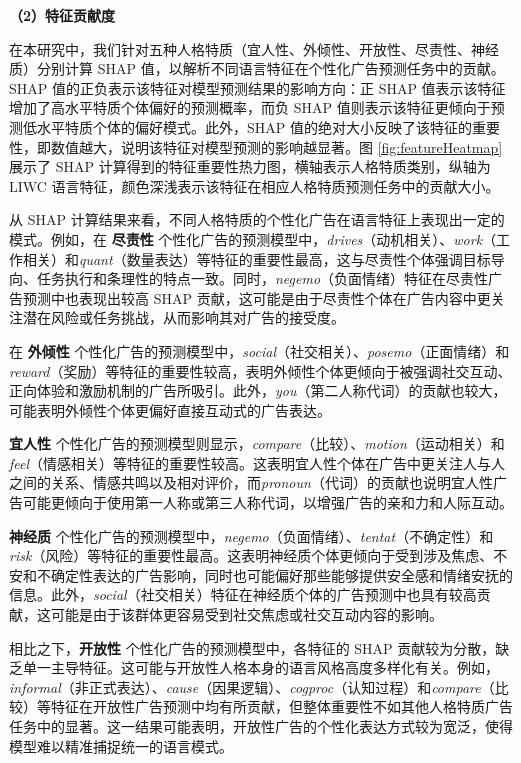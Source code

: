 \textbf{（2）特征贡献度}

在本研究中，我们针对五种人格特质（宜人性、外倾性、开放性、尽责性、神经质）分别计算 SHAP 值，以解析不同语言特征在个性化广告预测任务中的贡献。SHAP 值的正负表示该特征对模型预测结果的影响方向：正 SHAP 值表示该特征增加了高水平特质个体偏好的预测概率，而负 SHAP 值则表示该特征更倾向于预测低水平特质个体的偏好模式。此外，SHAP 值的绝对大小反映了该特征的重要性，即数值越大，说明该特征对模型预测的影响越显著。图 \ref{fig:featureHeatmap} 展示了 SHAP 计算得到的特征重要性热力图，横轴表示人格特质类别，纵轴为 LIWC 语言特征，颜色深浅表示该特征在相应人格特质预测任务中的贡献大小。

从 SHAP 计算结果来看，不同人格特质的个性化广告在语言特征上表现出一定的模式。例如，在 \textbf{尽责性} 个性化广告的预测模型中，\textit{drives}（动机相关）、\textit{work}（工作相关）和\textit{quant}（数量表达）等特征的重要性最高，这与尽责性个体强调目标导向、任务执行和条理性的特点一致。同时，\textit{negemo}（负面情绪）特征在尽责性广告预测中也表现出较高 SHAP 贡献，这可能是由于尽责性个体在广告内容中更关注潜在风险或任务挑战，从而影响其对广告的接受度。

在 \textbf{外倾性} 个性化广告的预测模型中，\textit{social}（社交相关）、\textit{posemo}（正面情绪）和\textit{reward}（奖励）等特征的重要性较高，表明外倾性个体更倾向于被强调社交互动、正向体验和激励机制的广告所吸引。此外，\textit{you}（第二人称代词）的贡献也较大，可能表明外倾性个体更偏好直接互动式的广告表达。

\textbf{宜人性} 个性化广告的预测模型则显示，\textit{compare}（比较）、\textit{motion}（运动相关）和\textit{feel}（情感相关）等特征的重要性较高。这表明宜人性个体在广告中更关注人与人之间的关系、情感共鸣以及相对评价，而\textit{pronoun}（代词）的贡献也说明宜人性广告可能更倾向于使用第一人称或第三人称代词，以增强广告的亲和力和人际互动。

\textbf{神经质} 个性化广告的预测模型中，\textit{negemo}（负面情绪）、\textit{tentat}（不确定性）和\textit{risk}（风险）等特征的重要性最高。这表明神经质个体更倾向于受到涉及焦虑、不安和不确定性表达的广告影响，同时也可能偏好那些能够提供安全感和情绪安抚的信息。此外，\textit{social}（社交相关）特征在神经质个体的广告预测中也具有较高贡献，这可能是由于该群体更容易受到社交焦虑或社交互动内容的影响。

相比之下，\textbf{开放性} 个性化广告的预测模型中，各特征的 SHAP 贡献较为分散，缺乏单一主导特征。这可能与开放性人格本身的语言风格高度多样化有关。例如，\textit{informal}（非正式表达）、\textit{cause}（因果逻辑）、\textit{cogproc}（认知过程）和\textit{compare}（比较）等特征在开放性广告预测中均有所贡献，但整体重要性不如其他人格特质广告任务中的显著。这一结果可能表明，开放性广告的个性化表达方式较为宽泛，使得模型难以精准捕捉统一的语言模式。

